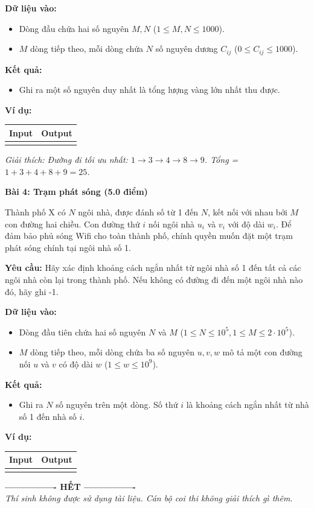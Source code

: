 \documentclass[11pt, a4paper]{article}
\newcommand{\bai}[2]{\vspace{0.5cm}\noindent\textbf{\large Bài #1: #2}}
\newcommand{\iobox}[2]{
    \begin{center}
    \begin{tabularx}{0.9\textwidth}{|X|X|}
    \hline
    \textbf{Input} & \textbf{Output} \\
    \hline
    \vtop{#1} & \vtop{#2} \\
    \hline
    \end{tabularx}
    \end{center}
}
\begin{document}
\textbf{Dữ liệu vào:}
\begin{itemize}
    \item Dòng đầu chứa hai số nguyên $M, N$ ($1 \le M, N \le 1000$).
    \item $M$ dòng tiếp theo, mỗi dòng chứa $N$ số nguyên dương $C_{ij}$ ($0 \le C_{ij} \le 1000$).
\end{itemize}

\textbf{Kết quả:}
\begin{itemize}
    \item Ghi ra một số nguyên duy nhất là tổng lượng vàng lớn nhất thu được.
\end{itemize}

\textbf{Ví dụ:}
\iobox{
3 3 \newline
1 2 5 \newline
3 4 1 \newline
1 8 9
}{
25
}
\textit{Giải thích: Đường đi tối ưu nhất: $1 \to 3 \to 4 \to 8 \to 9$. Tổng = $1+3+4+8+9 = 25$.}

\newpage

\bai{4}{Trạm phát sóng (5.0 điểm)}

Thành phố X có $N$ ngôi nhà, được đánh số từ 1 đến $N$, kết nối với nhau bởi $M$ con đường hai chiều. Con đường thứ $i$ nối ngôi nhà $u_i$ và $v_i$ với độ dài $w_i$. Để đảm bảo phủ sóng Wifi cho toàn thành phố, chính quyền muốn đặt một trạm phát sóng chính tại ngôi nhà số 1.

\textbf{Yêu cầu:} Hãy xác định khoảng cách ngắn nhất từ ngôi nhà số 1 đến tất cả các ngôi nhà còn lại trong thành phố. Nếu không có đường đi đến một ngôi nhà nào đó, hãy ghi -1.

\textbf{Dữ liệu vào:}
\begin{itemize}
    \item Dòng đầu tiên chứa hai số nguyên $N$ và $M$ ($1 \le N \le 10^5, 1 \le M \le 2 \cdot 10^5$).
    \item $M$ dòng tiếp theo, mỗi dòng chứa ba số nguyên $u, v, w$ mô tả một con đường nối $u$ và $v$ có độ dài $w$ ($1 \le w \le 10^9$).
\end{itemize}

\textbf{Kết quả:}
\begin{itemize}
    \item Ghi ra $N$ số nguyên trên một dòng. Số thứ $i$ là khoảng cách ngắn nhất từ nhà số 1 đến nhà số $i$.
\end{itemize}
  
\textbf{Ví dụ: }
\iobox{
4 4 \newline
1 2 4 \newline
1 3 1 \newline
3 2 2 \newline
3 4 5
}{
0 3 1 6
}

\vspace{1cm}
\begin{center}
    \textbf{---------------- HẾT ----------------} \\
    \textit{Thí sinh không được sử dụng tài liệu. Cán bộ coi thi không giải thích gì thêm.}
\end{center}
\end{document}
